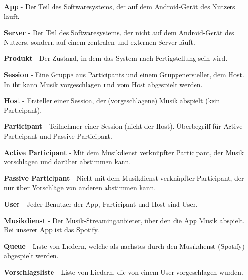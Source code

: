 \documentclass[oneside, ngerman]{sdqtechreport}
\begin{document}
\textbf{App}
 - Der Teil des Softwaresystems, der auf dem Android-Gerät des Nutzers läuft.

\textbf{Server}
 - Der Teil des Softwaresystems, der nicht auf dem Android-Gerät des Nutzers, sondern auf einem zentralen und externen Server läuft.

\textbf{Produkt}
 - Der Zustand, in dem das System nach Fertigstellung sein wird.

\textbf{Session}
 - Eine Gruppe aus Participants und einem Gruppenersteller, dem Host. In ihr kann Musik vorgeschlagen und vom Host abgespielt werden.

\textbf{Host}
 - Ersteller einer Session, der (vorgeschlagene) Musik abspielt (kein Participant).

\textbf{Participant}
 - Teilnehmer einer Session (nicht der Host). Überbegriff für Active Participant und Passive Participant.

\textbf{Active Participant}
 - Mit dem Musikdienst verknüpfter Participant, der Musik vorschlagen und darüber abstimmen kann.

\textbf{Passive Participant}
 - Nicht mit dem Musikdienst verknüpfter Participant, der nur über Vorschläge von anderen abstimmen kann.

\textbf{User}
 - Jeder Benutzer der App, Participant und Host sind User.

\textbf{Musikdienst}
 - Der Musik-Streaminganbieter, über den die App Musik abspielt. Bei unserer App ist das Spotify.
 
\textbf{Queue}
 - Liste von Liedern, welche als nächstes durch den Musikdienst (Spotify) abgespielt werden.

\textbf{Vorschlagsliste}
 - Liste von Liedern, die von einem User vorgeschlagen wurden.
\end{document}
